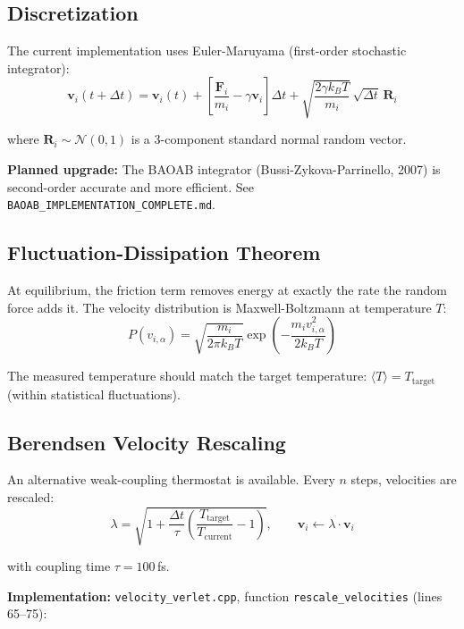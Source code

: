 \documentclass[11pt]{article}
\begin{document}
\subsection{Discretization}

The current implementation uses Euler-Maruyama (first-order stochastic integrator):
\begin{equation}
\mathbf{v}_i(t+\Delta t) = \mathbf{v}_i(t) + \left[\frac{\mathbf{F}_i}{m_i} - \gamma\mathbf{v}_i\right]\Delta t + \sqrt{\frac{2\gamma k_B T}{m_i}}\,\sqrt{\Delta t}\,\mathbf{R}_i
\end{equation}

where $\mathbf{R}_i \sim \mathcal{N}(0,1)$ is a 3-component standard normal random vector.

\textbf{Planned upgrade:} The BAOAB integrator (Bussi-Zykova-Parrinello, 2007) is second-order accurate and more efficient. See \texttt{BAOAB\_IMPLEMENTATION\_COMPLETE.md}.

\subsection{Fluctuation-Dissipation Theorem}

At equilibrium, the friction term removes energy at exactly the rate the random force adds it. The velocity distribution is Maxwell-Boltzmann at temperature $T$:
\begin{equation}
P(v_{i,\alpha}) = \sqrt{\frac{m_i}{2\pi k_B T}} \exp\!\left(-\frac{m_i v_{i,\alpha}^2}{2 k_B T}\right)
\end{equation}

The measured temperature should match the target temperature: $\langle T \rangle = T_{\text{target}}$ (within statistical fluctuations).

\subsection{Berendsen Velocity Rescaling}

An alternative weak-coupling thermostat is available. Every $n$ steps, velocities are rescaled:
\begin{equation}
\lambda = \sqrt{1 + \frac{\Delta t}{\tau}\left(\frac{T_{\text{target}}}{T_{\text{current}}} - 1\right)}, \qquad \mathbf{v}_i \gets \lambda \cdot \mathbf{v}_i
\end{equation}

with coupling time $\tau = 100$\,fs.

\textbf{Implementation:} \texttt{velocity\_verlet.cpp}, function \texttt{rescale\_velocities} (lines 65--75):
\end{document}
